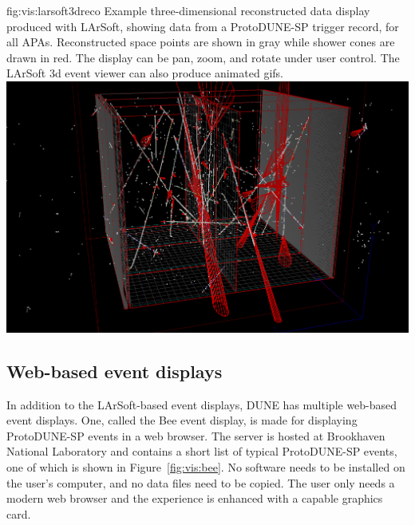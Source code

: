 \documentclass[../main-v1.tex]{subfiles}
\begin{document}
\begin{dunefigure}
{fig:vis:larsoft3dreco} 
{Example three-dimensional reconstructed data display produced with LArSoft, showing data from a ProtoDUNE-SP trigger record, for all APAs.  Reconstructed space points are shown in gray while shower cones are drawn in red.  The display can be pan, zoom, and rotate under user control.  The LArSoft 3d event viewer can also produce animated gifs.}
\includegraphics[width=0.9 \textwidth]{graphics/EventDisplays/larsoft_reco_evd_3d.png}
\end{dunefigure}

\subsection{Web-based event displays}
\label{sec:visualization:web}

In addition to the LArSoft-based event displays, DUNE has multiple web-based event displays.  One, called the Bee event display, is made for displaying ProtoDUNE-SP events in a web browser.  The server is hosted at Brookhaven National Laboratory and contains a short list of typical ProtoDUNE-SP events, one of which is shown in Figure~\ref{fig:vis:bee}. No software needs to be installed on the user's computer, and no data files need to be copied.  The user only needs a modern web browser and the experience is enhanced with a capable graphics card.
\end{document}
